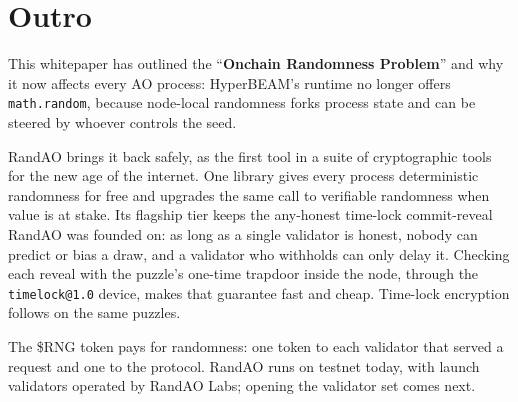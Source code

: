 \section{Outro}\label{sec:outro}

This whitepaper has outlined the ``\textbf{Onchain Randomness Problem}'' and why it now affects every AO process: HyperBEAM's runtime no longer offers \texttt{math.random}, because node-local randomness forks process state and can be steered by whoever controls the seed.

RandAO brings it back safely, as the first tool in a suite of cryptographic tools for the new age of the internet. One library gives every process deterministic randomness for free and upgrades the same call to verifiable randomness when value is at stake. Its flagship tier keeps the any-honest time-lock commit-reveal RandAO was founded on: as long as a single validator is honest, nobody can predict or bias a draw, and a validator who withholds can only delay it. Checking each reveal with the puzzle's one-time trapdoor inside the node, through the \texttt{timelock@1.0} device, makes that guarantee fast and cheap. Time-lock encryption follows on the same puzzles.

The \$RNG token pays for randomness: one token to each validator that served a request and one to the protocol. RandAO runs on testnet today, with launch validators operated by RandAO Labs; opening the validator set comes next.
